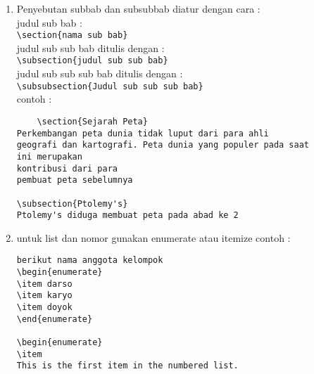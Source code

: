 \begin{enumerate}
    \item Penyebutan subbab dan subsubbab diatur dengan cara : \\
    judul sub bab : \\ 
    \verb|\section{nama sub bab}| \\
    judul sub sub bab ditulis dengan :\\ 
    \verb|\subsection{judul sub sub bab} | \\
    judul sub sub sub bab ditulis dengan : \\ \verb|\subsubsection{Judul sub sub sub bab} | \\
    contoh :
    \begin{verbatim}
    \section{Sejarah Peta}
Perkembangan peta dunia tidak luput dari para ahli 
geografi dan kartografi. Peta dunia yang populer pada saat 
ini merupakan 
kontribusi dari para 
pembuat peta sebelumnya

\subsection{Ptolemy's}
Ptolemy's diduga membuat peta pada abad ke 2
\end{verbatim}
    
    \item untuk list dan nomor gunakan enumerate atau itemize contoh :
    \begin{verbatim}
berikut nama anggota kelompok
\begin{enumerate}
\item darso
\item karyo
\item doyok
\end{enumerate}

\begin{enumerate}
\item
This is the first item in the numbered list.


\end{verbatim}
\end{enumerate}
